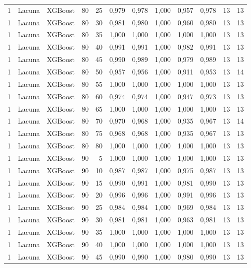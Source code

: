 \begin{longtable}{@{}rllrrrrrrrrr@{}}
1 & Lacuna & XGBoost & 80 & 25 & 0,979 & 0,978 & 1,000 & 0,957 & 0,978 & 13 & 13 \\
1 & Lacuna & XGBoost & 80 & 30 & 0,981 & 0,980 & 1,000 & 0,960 & 0,980 & 13 & 13 \\
1 & Lacuna & XGBoost & 80 & 35 & 1,000 & 1,000 & 1,000 & 1,000 & 1,000 & 13 & 13 \\
1 & Lacuna & XGBoost & 80 & 40 & 0,991 & 0,991 & 1,000 & 0,982 & 0,991 & 13 & 13 \\
1 & Lacuna & XGBoost & 80 & 45 & 0,990 & 0,989 & 1,000 & 0,979 & 0,989 & 13 & 13 \\
1 & Lacuna & XGBoost & 80 & 50 & 0,957 & 0,956 & 1,000 & 0,911 & 0,953 & 13 & 14 \\
1 & Lacuna & XGBoost & 80 & 55 & 1,000 & 1,000 & 1,000 & 1,000 & 1,000 & 13 & 13 \\
1 & Lacuna & XGBoost & 80 & 60 & 0,974 & 0,974 & 1,000 & 0,947 & 0,973 & 13 & 13 \\
1 & Lacuna & XGBoost & 80 & 65 & 1,000 & 1,000 & 1,000 & 1,000 & 1,000 & 13 & 13 \\
1 & Lacuna & XGBoost & 80 & 70 & 0,970 & 0,968 & 1,000 & 0,935 & 0,967 & 13 & 14 \\
1 & Lacuna & XGBoost & 80 & 75 & 0,968 & 0,968 & 1,000 & 0,935 & 0,967 & 13 & 13 \\
1 & Lacuna & XGBoost & 80 & 80 & 1,000 & 1,000 & 1,000 & 1,000 & 1,000 & 13 & 13 \\
1 & Lacuna & XGBoost & 90 & 5 & 1,000 & 1,000 & 1,000 & 1,000 & 1,000 & 13 & 13 \\
1 & Lacuna & XGBoost & 90 & 10 & 0,987 & 0,987 & 1,000 & 0,975 & 0,987 & 13 & 13 \\
1 & Lacuna & XGBoost & 90 & 15 & 0,990 & 0,991 & 1,000 & 0,981 & 0,990 & 13 & 13 \\
1 & Lacuna & XGBoost & 90 & 20 & 0,996 & 0,996 & 1,000 & 0,991 & 0,996 & 13 & 13 \\
1 & Lacuna & XGBoost & 90 & 25 & 0,984 & 0,984 & 1,000 & 0,969 & 0,984 & 13 & 13 \\
1 & Lacuna & XGBoost & 90 & 30 & 0,981 & 0,981 & 1,000 & 0,963 & 0,981 & 13 & 13 \\
1 & Lacuna & XGBoost & 90 & 35 & 1,000 & 1,000 & 1,000 & 1,000 & 1,000 & 13 & 13 \\
1 & Lacuna & XGBoost & 90 & 40 & 1,000 & 1,000 & 1,000 & 1,000 & 1,000 & 13 & 13 \\
1 & Lacuna & XGBoost & 90 & 45 & 0,990 & 0,990 & 1,000 & 0,980 & 0,990 & 13 & 13 \\

\end{longtable}
